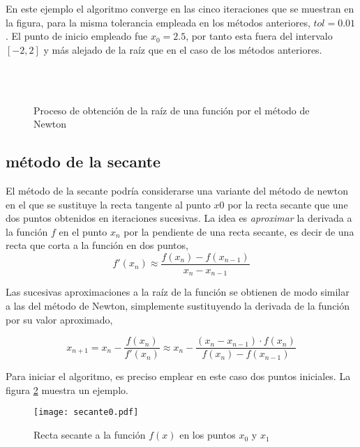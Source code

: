 En este ejemplo el algoritmo converge en las cinco iteraciones que se muestran en la figura, para la misma tolerancia empleada en los métodos anteriores, $tol=0.01$. El punto de inicio empleado fue $x_0=2.5$, por tanto esta fuera del intervalo $[-2, 2]$ y más alejado de la raíz que en el caso de los métodos anteriores.   

\begin{figure}
\centering
{} \qquad
{}\\
\qquad
{}\\
\qquad
{}

\caption{Proceso de obtención de la raíz de una función por el método de Newton}
\label{fig:newton2}
\end{figure}
\subsection{método de la secante}
El método de la secante podría considerarse una variante del método de newton en el que se sustituye la recta tangente al punto $x0$ por la recta secante que une dos puntos obtenidos en iteraciones sucesivas. La idea es \emph{aproximar} la derivada a la función $f$ en el punto $x_n$ por la pendiente de una recta secante, es decir de una recta que corta a la función en dos puntos, 
\begin{equation*}
f'(x_n)\approx \frac{f(x_n)-f(x_{n-1})}{x_n-x_{n-1}}
\end{equation*}

Las sucesivas aproximaciones a la raíz de la función se obtienen de modo similar a las del método de Newton, simplemente sustituyendo la derivada de la función por su valor aproximado,

\begin{equation*}
x_{n+1}=x_n-\frac{f(x_n)}{f'(x_n)}\approx x_n-\frac{(x_n-x_{n-1})\cdot f(x_n)}{f(x_n)-f(x_{n-1})}
\end{equation*}

Para iniciar el algoritmo, es preciso emplear en este caso dos puntos iniciales. La figura \ref{fig:secante} muestra un ejemplo.

\begin{figure}[h]
\texttt{[image: secante0.pdf]}
\caption{Recta secante a la  función $f(x)$ en los puntos $x_0$ y $x_1$}
\label{fig:secante}
\end{figure}

